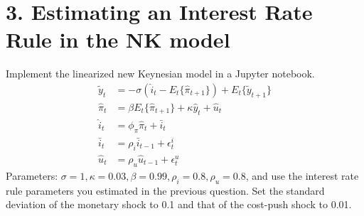\documentclass{article}
\newcommand{\1}{\mathbf{1}}
\begin{document}
\section*{3. Estimating an Interest Rate Rule in the NK model}
Implement the linearized new Keynesian model in a Jupyter notebook. 
\begin{align*}
	\tilde{y}_t &=-\sigma\left(\hat{i}_t-E_t\{\hat{\pi}_{t+1}\}\right)+E_t\{\tilde{y}_{t+1}\} \\
	\hat{\pi}_t&= \beta E_t \{\hat{\pi}_{t+1}\}+ \kappa \hat{y}_{t} + \hat{u}_t \\
	\hat{i}_t&= \phi_\pi\hat{\pi}_t+ \bar{i}_t \\
	\bar{i}_t&=\rho_i \bar{i}_{t-1}+\epsilon^i_t \\
	\hat{u}_{t}&=\rho_u \hat{u}_{t-1}+\epsilon^u_t 
\end{align*}
Parameters: $\sigma=1,\kappa=0.03,\beta=0.99, \rho_i = 0.8,\rho_u=0.8$, and use the interest rate rule parameters you estimated in the previous question. Set the standard deviation of the monetary shock to 0.1 and that of the cost-push shock to 0.01.
\end{document}
